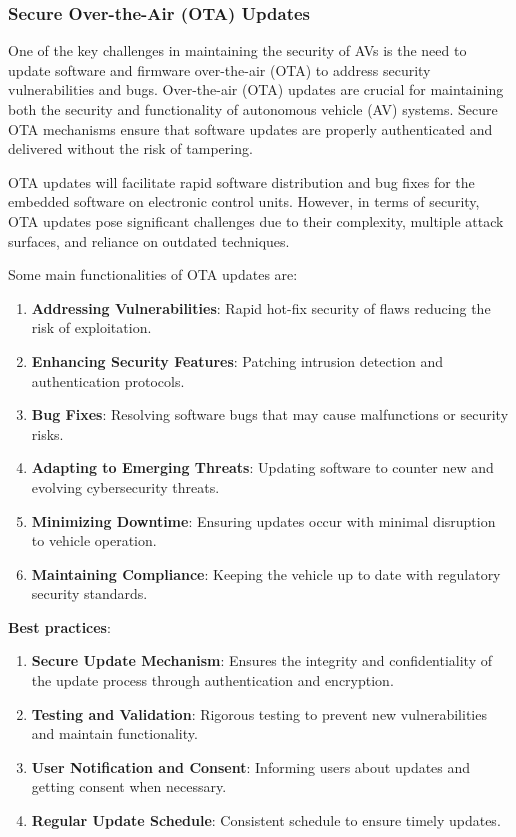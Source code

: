 \subsubsection{Secure Over-the-Air (OTA) Updates}\label{subsubsec:secure-over-the-air-ota-updates}

One of the key challenges in maintaining the security of AVs is the need to update software and firmware over-the-air (OTA) to address security vulnerabilities and bugs.
Over-the-air (OTA) updates are crucial for maintaining both the security and functionality of autonomous vehicle (AV) systems\cite{durlik2022cybersecurity, ahangar2021survey}.
Secure OTA mechanisms ensure that software updates are properly authenticated and delivered without the risk of tampering.

OTA updates will facilitate rapid software distribution and bug fixes for the embedded software on electronic control units.
However, in terms of security, OTA updates pose significant challenges due to their complexity, multiple attack surfaces, and reliance on outdated techniques.

Some main functionalities of OTA updates are:
\begin{enumerate}
    \item \textbf{Addressing Vulnerabilities}: Rapid hot-fix security of flaws reducing the risk of exploitation.
    \item \textbf{Enhancing Security Features}: Patching intrusion detection and authentication protocols.
    \item \textbf{Bug Fixes}: Resolving software bugs that may cause malfunctions or security risks.
    \item \textbf{Adapting to Emerging Threats}: Updating software to counter new and evolving cybersecurity threats.
    \item \textbf{Minimizing Downtime}: Ensuring updates occur with minimal disruption to vehicle operation.
    \item \textbf{Maintaining Compliance}: Keeping the vehicle up to date with regulatory security standards.
\end{enumerate}

\textbf{Best practices}:
\begin{enumerate}
    \item \textbf{Secure Update Mechanism}: Ensures the integrity and confidentiality of the update process through authentication and encryption.
    \item \textbf{Testing and Validation}: Rigorous testing to prevent new vulnerabilities and maintain functionality.
    \item \textbf{User Notification and Consent}: Informing users about updates and getting consent when necessary.
    \item \textbf{Regular Update Schedule}: Consistent schedule to ensure timely updates.
\end{enumerate}


